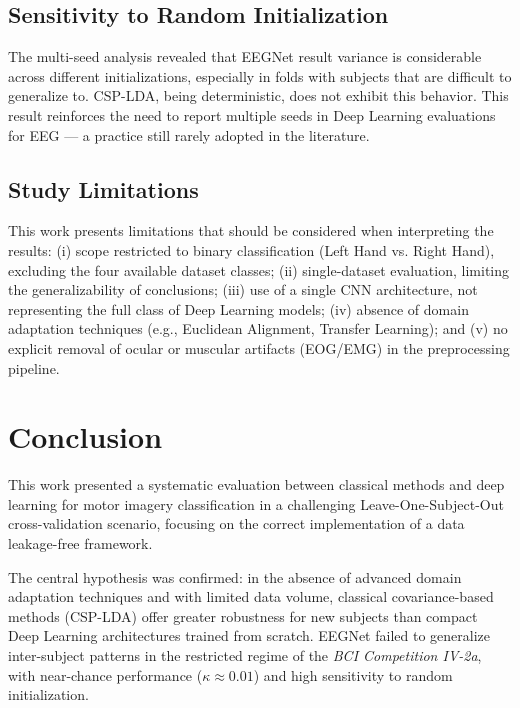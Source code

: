 \documentclass[conference]{IEEEtran}
\begin{document}
\subsection{Sensitivity to Random Initialization}

The multi-seed analysis revealed that EEGNet result variance is considerable across different initializations, especially in folds with subjects that are difficult to generalize to. CSP-LDA, being deterministic, does not exhibit this behavior. This result reinforces the need to report multiple seeds in Deep Learning evaluations for EEG --- a practice still rarely adopted in the literature.

\subsection{Study Limitations}

This work presents limitations that should be considered when interpreting the results: (i) scope restricted to binary classification (Left Hand vs. Right Hand), excluding the four available dataset classes; (ii) single-dataset evaluation, limiting the generalizability of conclusions; (iii) use of a single CNN architecture, not representing the full class of Deep Learning models; (iv) absence of domain adaptation techniques (e.g., Euclidean Alignment, Transfer Learning); and (v) no explicit removal of ocular or muscular artifacts (EOG/EMG) in the preprocessing pipeline.

\section{Conclusion}

This work presented a systematic evaluation between classical methods and deep learning for motor imagery classification in a challenging Leave-One-Subject-Out cross-validation scenario, focusing on the correct implementation of a data leakage-free framework.

The central hypothesis was confirmed: in the absence of advanced domain adaptation techniques and with limited data volume, classical covariance-based methods (CSP-LDA) offer greater robustness for new subjects than compact Deep Learning architectures trained from scratch. EEGNet failed to generalize inter-subject patterns in the restricted regime of the \textit{BCI Competition IV-2a}, with near-chance performance ($\kappa \approx 0.01$) and high sensitivity to random initialization.
\end{document}
